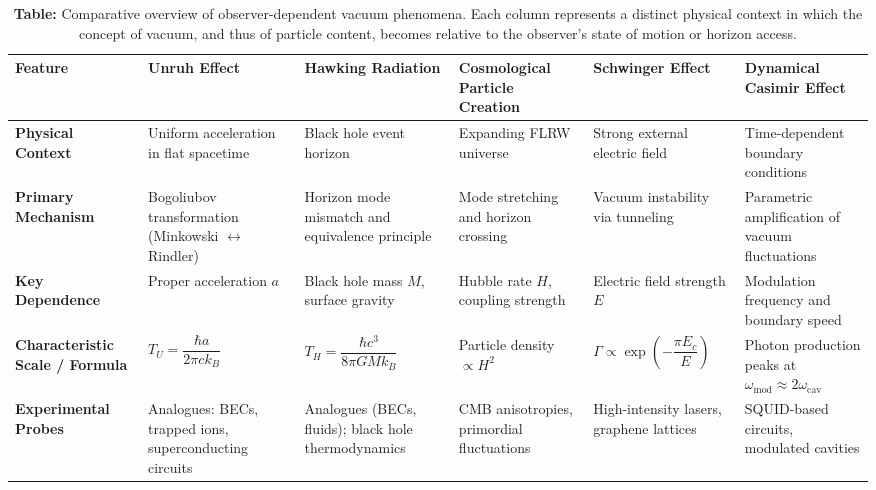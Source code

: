 \newpage
\vspace{50em}
\begin{table}[ht]
\centering
\footnotesize
\renewcommand{\arraystretch}{1.3}
\setlength{\tabcolsep}{3pt}
\begin{tabular}{|>{\centering\arraybackslash}m{2.0cm}|
                >{\centering\arraybackslash}m{2.2cm}|
                >{\centering\arraybackslash}m{2.2cm}|
                >{\centering\arraybackslash}m{2.2cm}|
                >{\centering\arraybackslash}m{2.2cm}|
                >{\centering\arraybackslash}m{2.2cm}|}
\hline
\textbf{Feature} & \textbf{Unruh Effect} & \textbf{Hawking Radiation} & \textbf{Cosmological Particle Creation} & \textbf{Schwinger Effect} & \textbf{Dynamical Casimir Effect} \\
\hline
\textbf{Physical Context} & Uniform acceleration in flat spacetime & Black hole event horizon & Expanding FLRW universe & Strong external electric field & Time-dependent boundary conditions \\
\hline
\textbf{Primary Mechanism} & Bogoliubov transformation (Minkowski $\leftrightarrow$ Rindler) & Horizon mode mismatch and equivalence principle & Mode stretching and horizon crossing & Vacuum instability via tunneling & Parametric amplification of vacuum fluctuations \\
\hline
\textbf{Key Dependence} & Proper acceleration $a$ & Black hole mass $M$, surface gravity & Hubble rate $H$, coupling strength & Electric field strength $E$ & Modulation frequency and boundary speed \\
\hline
\textbf{Characteristic Scale / Formula} & $T_U = \dfrac{\hbar a}{2\pi c k_B}$ & $T_H = \dfrac{\hbar c^3}{8\pi G M k_B}$ & Particle density $\propto H^2$ & $\Gamma \propto \exp\left(-\dfrac{\pi E_c}{E}\right)$ & Photon production peaks at $\omega_{\text{mod}} \approx 2\omega_{\text{cav}}$ \\
\hline
\textbf{Experimental Probes} & Analogues: BECs, trapped ions, superconducting circuits & Analogues (BECs, fluids); black hole thermodynamics & CMB anisotropies, primordial fluctuations & High-intensity lasers, graphene lattices & SQUID-based circuits, modulated cavities \\
\hline
\end{tabular}
\caption*{
\centering
\textbf{Table:} Comparative overview of observer-dependent vacuum phenomena. Each column represents a distinct physical context in which the concept of vacuum, and thus of particle content, becomes relative to the observer’s state of motion or horizon access.
}
\end{table}
